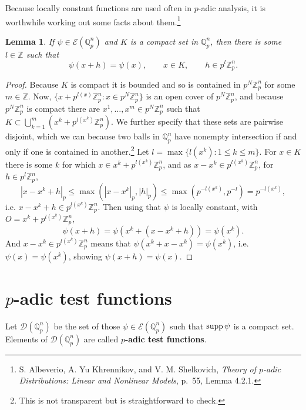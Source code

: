 \documentclass{article}
\newcommand{\supp}{\ensuremath\mathrm{supp}\,}
\newtheorem{lemma}[theorem]{Lemma}
\theoremstyle{definition}
\begin{document}
Because locally constant functions are used often in $p$-adic analysis, it is worthwhile working out some facts about
them.\footnote{S. Albeverio, A. Yu Khrennikov, and V. M. Shelkovich,
{\em Theory of $p$-adic Distributions: Linear and Nonlinear Models},
p.~55, Lemma 4.2.1.}

\begin{lemma}
If $\psi \in \mathcal{E}(\mathbb{Q}_p^n)$ and $K$ is a compact set in $\mathbb{Q}_p^n$, then there is some
$l \in \mathbb{Z}$ such that
\[
\psi(x+h) = \psi(x),\qquad  x \in K,\qquad h \in p^l \mathbb{Z}_p^n.
\]
\end{lemma}
\begin{proof}
Because $K$ is compact it is bounded and so is contained in $p^N \mathbb{Z}_p^n$ for some $m \in \mathbb{Z}$. 
Now, $\{x+p^{l(x)} \mathbb{Z}_p^n: x \in p^N \mathbb{Z}_p^n\}$ is an open cover of $p^N \mathbb{Z}_p^n$, and because
$p^N \mathbb{Z}_p^n$ is compact there are $x^1,\ldots,x^m \in p^N \mathbb{Z}_p^n$ such that
$K \subset \bigcup_{k=1}^m  (x^k+p^{l(x^k)} \mathbb{Z}_p^n)$. We further specify that these sets are pairwise disjoint, which we can
because two balls in $\mathbb{Q}_p^n$ have nonempty intersection if and only if one is contained in another.\footnote{This
is not transparent but is straightforward to check.} 
Let $l=\max\{l(x^k): 1 \leq k \leq m\}$. 
For $x \in K$ there is some $k$ for which
$x \in x^k+p^{l(x^k)} \mathbb{Z}_p^n$, and as $x-x^k \in p^{l(x^k)} \mathbb{Z}_p^n$, for  $h \in p^l \mathbb{Z}_p^n$, 
\[
|x-x^k + h|_p \leq \max(|x-x^k|_p,|h|_p) \leq \max(p^{-l(x^k)},p^{-l}) = p^{-l(x^k)},
\]
i.e. $x-x^k + h \in p^{l(x^k)} \mathbb{Z}_p^n$. 
Then using that $\psi$ is locally constant, with $O=x^k + p^{l(x^k)} \mathbb{Z}_p^n$,
\[
\psi(x+h) = \psi(x^k+(x-x^k+h)) = \psi(x^k).
\]
And $x-x^k \in p^{l(x^k)} \mathbb{Z}_p^n$ means that $\psi(x^k+x-x^k)=\psi(x^k)$, i.e. $\psi(x)=\psi(x^k)$, showing
$\psi(x+h)=\psi(x)$. 
\end{proof}




\section{$p$-adic test functions}
Let $\mathcal{D}(\mathbb{Q}_p^n)$ be the set of those $\psi \in \mathcal{E}(\mathbb{Q}_p^n)$ such that $\supp \psi$ is a compact set.
Elements of $\mathcal{D}(\mathbb{Q}_p^n)$ are called \textbf{$p$-adic test functions}.
\end{document}
